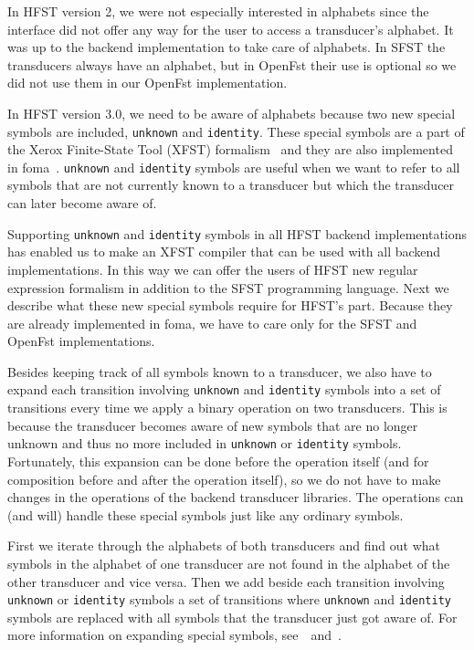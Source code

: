 \documentclass{llncs}
\begin{document}
In HFST version 2, we were not especially interested in alphabets 
since the interface did not offer any way for the user to access a 
transducer's alphabet. It was up to the backend implementation to take
care of alphabets. In SFST the transducers always have an alphabet,
but in OpenFst their use is optional so we did not use them in our
OpenFst implementation.

In HFST version 3.0, we need to be aware of alphabets because two new
special symbols are included, \texttt{unknown} and \texttt{identity}. 
These special symbols are a part of the Xerox Finite-State Tool (XFST) 
formalism~\cite[page x]{beesley/2003} and they are also implemented in
foma~\cite{hulden/2009}. \texttt{unknown} and \texttt{identity} symbols 
are useful when we want to refer to all symbols that are not currently 
known to a transducer but which the transducer can later become aware of. 

Supporting \texttt{unknown} and \texttt{identity} symbols in all HFST backend
implementations has enabled us to make an XFST compiler that can be used
with all backend implementations. 
In this way we can offer the users of HFST new regular expression
formalism in addition to the SFST programming language. Next we
describe what these new special symbols require for HFST's
part. Because they are already implemented in foma, we have to care
only for the SFST and OpenFst implementations.

Besides keeping track of all symbols known to a transducer, we also
have to expand each transition involving \texttt{unknown} and 
\texttt{identity} symbols into a set of transitions every time we apply 
a binary operation on two transducers. 
This is because the transducer becomes aware of new symbols that are
no longer unknown and thus no more included in \texttt{unknown} or 
\texttt{identity} symbols.
Fortunately, this expansion can be done before the operation itself 
(and for composition before and after the operation itself), so we do
not have to make changes in the operations of the backend transducer
libraries. 
The operations can (and will) handle these special symbols just
like any ordinary symbols. 

First we iterate through the alphabets of both transducers and find
out what symbols in the alphabet of one transducer are not found in
the alphabet of the other transducer and vice versa. 
Then we add beside each transition involving \texttt{unknown} or 
\texttt{identity} symbols a set of transitions where \texttt{unknown} 
and \texttt{identity} symbols are
replaced with all symbols that the transducer just got aware of. 
For more information on expanding special symbols, 
see~\cite{hulden/2009}~and~\cite{beesley/2003}.
\end{document}
